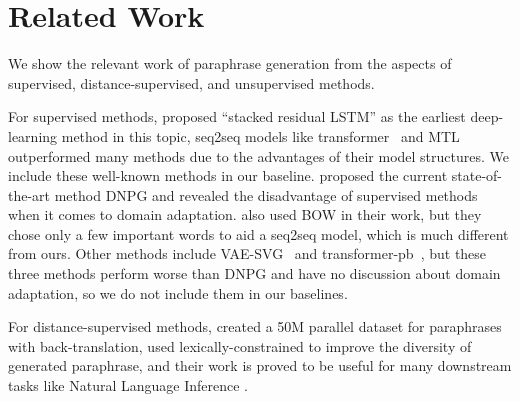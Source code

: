 \section{Related Work}
We show the relevant work of paraphrase generation from the aspects of supervised, distance-supervised, and unsupervised methods.

For supervised methods, \citet{prakash2016neural} proposed ``stacked residual LSTM'' as the earliest deep-learning method in this topic, seq2seq models like transformer~\citep{vaswani2017attention} and MTL~\citep{domhan2017using} outperformed many methods due to the advantages of their model structures. We include these well-known methods in our baseline.  \citet{li2019decomposable} proposed the current state-of-the-art method DNPG and revealed the disadvantage of supervised methods when it comes to domain adaptation. \citet{fu2019paraphrase} also used BOW in their work, but they chose only a few important words to aid a seq2seq model, which is much different from ours. Other methods include VAE-SVG~\citep{gupta2018deep} and transformer-pb~\citep{wang2019task}, but these three methods perform worse than DNPG and have no discussion about domain adaptation, so we do not include them in our baselines.

For distance-supervised methods, \citet{wieting2017paranmt} created a 50M parallel dataset for paraphrases with back-translation, \citet{hu2019parabank} used lexically-constrained to improve the diversity of generated paraphrase, and their work is proved to be useful for many downstream tasks like Natural Language Inference \citep{hu2019improved}.

